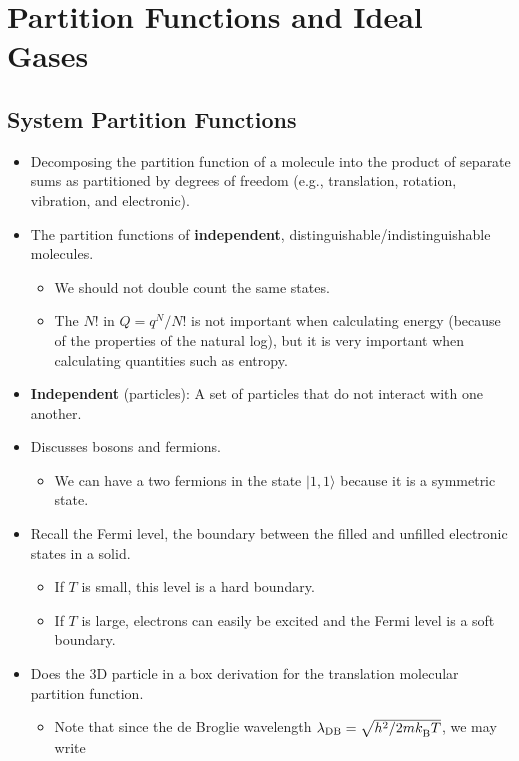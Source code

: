 \documentclass[../notes.tex]{subfiles}
\begin{document}
\chapter{Partition Functions and Ideal Gases}
\section{System Partition Functions}
\begin{itemize}
    \item {}Decomposing the partition function of a molecule into the product of separate sums as partitioned by degrees of freedom (e.g., translation, rotation, vibration, and electronic).
    \item The partition functions of \textbf{independent}, distinguishable/indistinguishable molecules.
    \begin{itemize}
        \item We should not double count the same states.
        \item The $N!$ in $Q=q^N/N!$ is not important when calculating energy (because of the properties of the natural log), but it is very important when calculating quantities such as entropy.
    \end{itemize}
    \item \textbf{Independent} (particles): A set of particles that do not interact with one another.
    \item Discusses bosons and fermions.
    \begin{itemize}
        \item We can have a two fermions in the state $|1,1\rangle$ because it is a symmetric state.
    \end{itemize}
    \item Recall the Fermi level, the boundary between the filled and unfilled electronic states in a solid.
    \begin{itemize}
        \item If $T$ is small, this level is a hard boundary.
        \item If $T$ is large, electrons can easily be excited and the Fermi level is a soft boundary.
    \end{itemize}
    \item Does the 3D particle in a box derivation for the translation molecular partition function.
    \begin{itemize}
        \item Note that since the de Broglie wavelength $\lambda_\text{DB}=\sqrt{h^2/2m{k_\text{B}^{}} T}$, we may write

\end{itemize}
\end{itemize}
\end{document}
